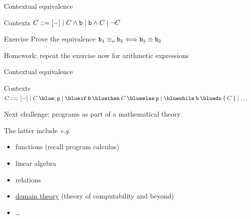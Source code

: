 \documentclass{beamer}
\begin{document}
\begin{frame}{Contextual equivalence}

        \begin{block}{Contexts}
                $C ::= [-] \mid C \wedge \mathtt{b} \mid \mathtt{b} \wedge C \mid \neg C$
        \end{block} 

        \bigskip
        \begin{block}{Exercise}
                Prove the equivalence $\mathtt{b_1} \equiv_o \mathtt{b_2} 
                \Longleftrightarrow \mathtt{b_1} \equiv \mathtt{b_2}$
        \end{block}

        \pause
        \vfill
        Homework: repeat the exercise now for arithmetic expressions
\end{frame}

\begin{frame}{Contextual equivalence}

        \begin{block}{Contexts}
                $C ::= [-] \mid C \> \prog{\blue ;} \> \prog{p} 
                \mid 
                \mathtt{{\blue if} \> b \> {\blue then} \>} C \mathtt{\> {\blue else} \> p} 
                \mid
                \mathtt{{\blue while} \> b \> {\blue do} \> \{ \>} C \mathtt{\> \}}
                \mid \dots$
        \end{block} 

        \vfill
        \pause
        \centering
\end{frame}

\begin{frame}{Next challenge: programs as part of a mathematical theory}
        
        \begin{center}
         \hspace{0.5cm} \scalebox{1.5}{${\hookrightarrow}$} 
        \hspace{0.5cm} 
        \end{center}

        The latter include \emph{e.g.}
        \begin{itemize}
                \item functions (recall program calculus)
                \item linear algebra
                \item relations
                \item \alert{\underline{domain theory}} (theory of computability and beyond)
                \item \dots
        \end{itemize}
\end{frame}
\end{document}
